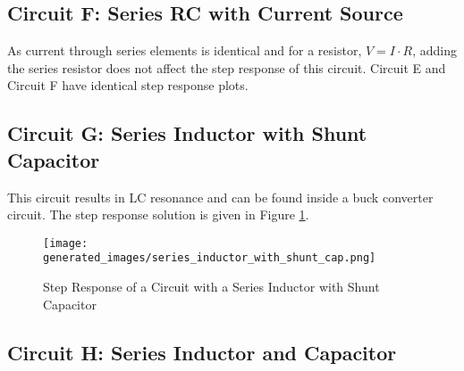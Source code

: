\documentclass[main.tex]{subfiles}
\begin{document}
\subsection{Circuit F: Series RC with Current Source}
As current through series elements is identical and for a resistor, $V = I \cdot R$, adding the series resistor does not affect the step response of this circuit. Circuit E and Circuit F have identical step response plots.

\subsection{Circuit G: Series Inductor with Shunt Capacitor}

This circuit results in LC resonance and can be found inside a buck converter circuit. The step response solution is given in Figure \ref{fig:step-response-series-ind-with-shunt-cap}.

\begin{figure}[H]
    \centering
    \texttt{[image: generated\_images/series\_inductor\_with\_shunt\_cap.png]}
    \caption{Step Response of a Circuit with a Series Inductor with Shunt Capacitor}
    \label{fig:step-response-series-ind-with-shunt-cap}
\end{figure}

\subsection{Circuit H: Series Inductor and Capacitor}
\end{document}
